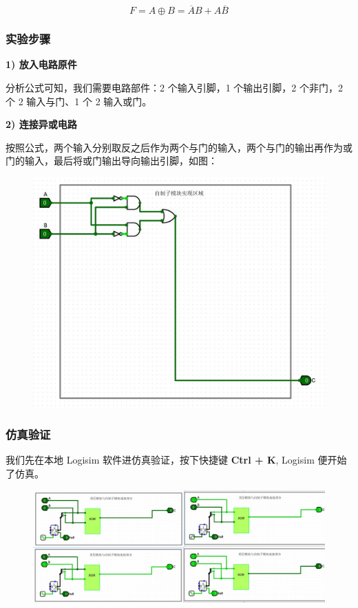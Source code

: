 \documentclass[UTF8]{ctexart}
\begin{document}
\[
    F = A \oplus B = \overline{A}B + A\overline{B}
\]


\subsubsection{实验步骤}


\textbf{1) 放入电路原件}

分析公式可知，我们需要电路部件：2 个输入引脚，1 个输出引脚，2 个非门，2 个 2 输入与门、1 个 2 输入或门。

\textbf{2) 连接异或电路}

按照公式，两个输入分别取反之后作为两个与门的输入，两个与门的输出再作为或门的输入，最后将或门输出导向输出引脚，如图：

\begin{figure}[H]
    \centering
    \includegraphics[width = .6\textwidth]{images/xor.jpg}
\end{figure}



\subsubsection{仿真验证}

我们先在本地 Logisim 软件进仿真验证，按下快捷键 \textbf{Ctrl + K}, Logisim 便开始了仿真。

\begin{figure}[H]
    \centering
    \includegraphics[width = \textwidth]{images/sim2.jpg}
\end{figure}
\end{document}
